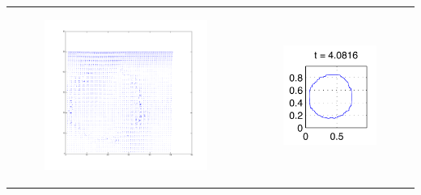 \documentclass[ucs]{beamer}
\begin{document}
\begin{frame}

\begin{tabular}{l l}
\begin{minipage}{0.5\textwidth}

\begin{figure}[h!]
\includegraphics[width=7cm]{plots/vel4.png}
\end{figure}
\end{minipage}
&
\begin{minipage}{0.5\textwidth}
\begin{figure}[h!]
  \includegraphics[width=4cm]{plots/interface_t4.png}
\end{figure}
\end{minipage}
\end{tabular}

\end{frame}
\end{document}
